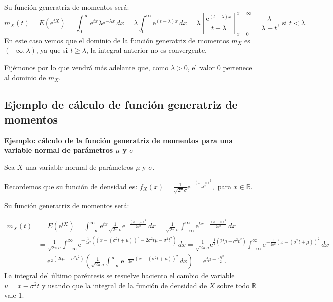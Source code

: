 \documentclass[]{book}
\begin{document}
Su función generatriz de momentos será:
\[
m_X (t)=E\left(\mathrm{e}^{tX}\right)=\int_0^\infty \mathrm{e}^{t x}\lambda \mathrm{e}^{-\lambda x}\, dx = \lambda \int_0^\infty\mathrm{e}^{(t-\lambda)x}\, dx = \lambda\left[\frac{\mathrm{e}^{(t-\lambda)x}}{t-\lambda}\right]_{x=0}^{x=\infty} = \frac{\lambda}{\lambda -t},\ \mbox{si } t<\lambda. 
\]
En este caso vemos que el dominio de la función generatriz de momentos \(m_X\) es \((-\infty,\lambda)\), ya que si \(t\geq \lambda\), la integral anterior no es convergente.

Fijémonos por lo que vendrá más adelante que, como \(\lambda >0\), el valor \(0\) pertenece al dominio de \(m_X\).

\hypertarget{ejemplo-de-cuxe1lculo-de-funciuxf3n-generatriz-de-momentos-2}{%
\subsection{Ejemplo de cálculo de función generatriz de momentos}\label{ejemplo-de-cuxe1lculo-de-funciuxf3n-generatriz-de-momentos-2}}

\textbf{Ejemplo: cálculo de la función generatriz de momentos para una variable normal de parámetros \(\mu\) y \(\sigma\)}

Sea \(X\) una variable normal de parámetros \(\mu\) y \(\sigma\).

Recordemos que su función de densidad es: \(f_X(x)=\frac{1}{\sqrt{2\pi}\sigma}\mathrm{e}^{-\frac{(x-\mu)^2}{2\sigma^2}},\) para \(x\in \mathbb{R}\).

Su función generatriz de momentos será:

\[
\begin{array}{rl}
m_X (t) & =E\left(\mathrm{e}^{tX}\right)=\int_{-\infty}^\infty \mathrm{e}^{tx}\frac{1}{\sqrt{2\pi}\sigma}\mathrm{e}^{-\frac{(x-\mu)^2}{2\sigma^2}}\, dx = \frac{1}{\sqrt{2\pi}\sigma} \int_{-\infty}^\infty \mathrm{e}^{tx-\frac{(x-\mu)^2}{2\sigma^2}}\, dx \\  & =  \frac{1}{\sqrt{2\pi}\sigma} \int_{-\infty}^\infty \mathrm{e}^{-\frac{1}{2\sigma^2}\left((x-(\sigma^2 t+\mu))^2-2\sigma^2 t \mu-\sigma^4t^2\right)}\, dx = \frac{1}{\sqrt{2\pi}\sigma} \mathrm{e}^{\frac{1}{2}(2 t \mu +\sigma^2 t^2)}\int_{-\infty}^\infty \mathrm{e}^{-\frac{1}{2\sigma^2}(x-(\sigma^2 t+\mu))^2}\, dx\\ &  = \mathrm{e}^{\frac{1}{2}(2 t \mu +\sigma^2 t^2)} \left( \frac{1}{\sqrt{2\pi}\sigma} \int_{-\infty}^\infty \mathrm{e}^{-\frac{1}{2\sigma^2}(x-(\sigma^2 t+\mu))^2}\, dx\right) =  \mathrm{e}^{ t \mu +\frac{\sigma^2 t^2}{2}}.
\end{array}
\]
La integral del último paréntesis se resuelve haciento el cambio de variable \(u=x-\sigma^2 t\) y usando que la integral de la función de densidad de \(X\) sobre todo \(\mathbb{R}\) vale 1.
\end{document}
